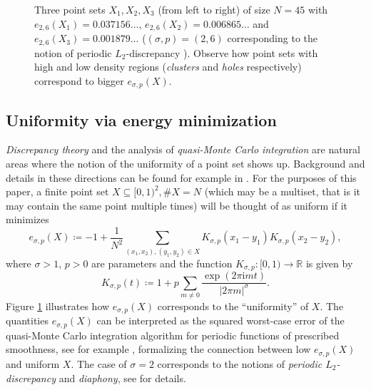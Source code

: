 \documentclass[]{interact}
\newcommand{\bbR}{\mathbb{R}}
\newcommand{\ra}{\rightarrow}
\newcommand{\sbse}{\subseteq}
\newcommand{\iu}{\mathrm{i}}
\theoremstyle{definition}
\numberwithin{table}{section} %
\numberwithin{figure}{section}
\begin{document}
\begin{figure}[t]
                        \caption{Three point sets $X_1, X_2, X_3$ (from left to right) of size $N=45$ with $e_{2, 6}(X_1) = 0.037156\dots$, $e_{2, 6}(X_2) = 0.006865\dots$ and $e_{2, 6}(X_3) = 0.001879\dots$ ($(\sigma, p) = (2, 6)$ corresponding to the notion of periodic $L_2$-discrepancy \cite{HKP21, HO16}). Observe how point sets with high and low density regions (\emph{clusters} and \emph{holes} respectively) correspond to bigger $e_{\sigma, p}(X)$.}
\label{fig:uniform}
\end{figure}

\subsection{Uniformity via energy minimization}

\emph{Discrepancy theory} and the analysis of \emph{quasi-Monte Carlo integration} are natural areas where the notion of the uniformity of a point set shows up. Background and details in these directions can be found for example in \cite{DT97, Mat10, Mon94, Nie78, Nie92, NW10}. For the purposes of this paper, a finite point set $X \sbse [0, 1)^2, \#X = N$ (which may be a multiset, that is it may contain the same point multiple times) will be thought of as uniform if it minimizes
$$
e_{\sigma, p}(X) \coloneqq -1 + \frac1{N^2} \sum_{(x_1, x_2), (y_1, y_2) \in X} K_{\sigma, p}(x_1-y_1) K_{\sigma, p}(x_2-y_2),
$$
where $\sigma > 1$, $p > 0$ are parameters and the function $K_{\sigma, p}: [0, 1) \ra \bbR$ is given by
$$
K_{\sigma, p}(t) \coloneqq 1 + p \sum_{m \neq 0} \frac{\exp(2\pi\iu m t)}{|2\pi m|^\sigma}.
$$
Figure \ref{fig:uniform} illustrates how $e_{\sigma, p}(X)$ corresponds to the ``uniformity'' of $X$. The quantities $e_{\sigma, p}(X)$ can be interpreted as the squared worst-case error of the quasi-Monte Carlo integration algorithm for periodic functions of prescribed smoothness, see for example \cite{BNR25, Dic07, HO16}, formalizing the connection between low $e_{\sigma, p}(X)$ and uniform $X$. The case of $\sigma=2$ corresponds to the notions of \emph{periodic $L_2$-discrepancy} and \emph{diaphony}, see \cite{BNR25, HKP21} for details.
\end{document}
